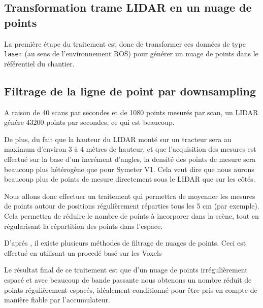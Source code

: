 \documentclass[12pt,a4paper]{report}
\begin{document}
	
		\subsection{Transformation trame LIDAR en un nuage de points}
	
		\para La première étape du traitement est donc de transformer ces données de type \verb|laser| (au sens de l'environnement ROS) pour générer un nuage de points dans le référentiel du chantier.
	
	
		\subsection{Filtrage de la ligne de point par downsampling}
	
		\para A raison de 40 scans par secondes et de 1080 points mesurés par scan, un LIDAR génére 43200 points par secondes, ce qui est beaucoup.
	
		\para De plus, du fait que la hauteur du LIDAR monté sur un tracteur sera au maximum d'environ 3 à 4 mètres de hauteur, et que l'acquisition des mesures est effectué sur la base d'un incrément d'angles, la densité des points de mesure sera beaucoup plus hétérogène que pour Symeter V1. Cela veut dire que nous aurons beaucoup plus de points de mesure directement sous le LIDAR que sur les côtés.
	
		\para Nous allons donc effectuer un traitement qui permettra de moyenner les mesures de points autour de positions régulièrement réparties tous les 5 cm (par exemple). Cela permettra de réduire le nombre de points à incorporer dans la scène,  tout en régularisant la répartition des points dans l'espace.
		
		\para D'aprés \cite{moreno_comparative_2016}, il existe plusieurs méthodes de filtrage de nuages de points. Ceci est effectué en utilisant un procedé basé sur les Voxels
	

		\para Le résultat final de ce traitement est que d'un nuage de points irrégulièrement espacé et avec beaucoup de bande passante nous obtenons un nombre réduit de points régulièrement espacés, idéalement conditionné pour être pris en compte de manière fiable par l'accumulateur.
	

		
\end{document}
